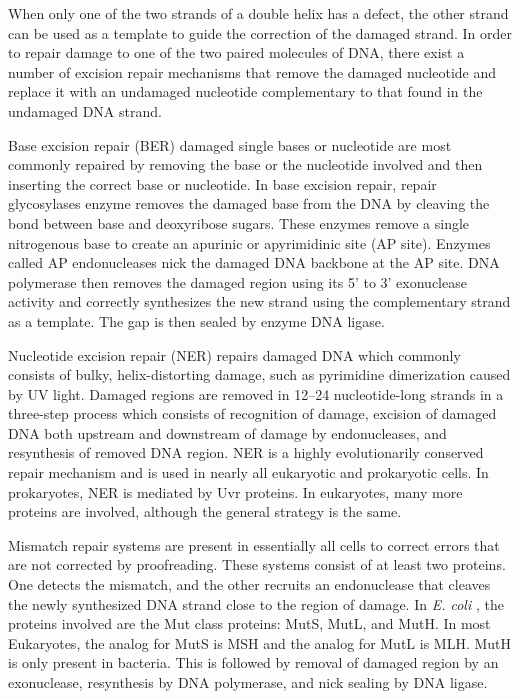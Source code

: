 When only one of the two strands of a double helix has a defect, the other strand can be used as a template to guide the correction of the damaged strand. In order to repair damage to one of the two paired molecules of DNA, there exist a number of excision repair mechanisms that remove the damaged nucleotide and replace it with an undamaged nucleotide complementary to that found in the undamaged DNA strand.

Base excision repair (BER) damaged single bases or nucleotide are most commonly repaired by removing the base or the nucleotide involved and then inserting the correct base or nucleotide. In base excision repair, repair glycosylases enzyme removes the damaged base from the DNA by cleaving the bond between base and deoxyribose sugars. These enzymes remove a single nitrogenous base to create an apurinic or apyrimidinic site (AP site). Enzymes called AP endonucleases nick the damaged DNA backbone at the AP site. DNA polymerase then removes the damaged region using its 5' to 3' exonuclease activity and correctly synthesizes the new strand using the complementary strand as a template. The gap is then sealed by enzyme DNA ligase.

Nucleotide excision repair (NER) repairs damaged DNA which commonly consists of bulky, helix-distorting damage, such as pyrimidine dimerization caused by UV light. Damaged regions are removed in 12--24 nucleotide-long strands in a three-step process which consists of recognition of damage, excision of damaged DNA both upstream and downstream of damage by endonucleases, and resynthesis of removed DNA region. NER is a highly evolutionarily conserved repair mechanism and is used in nearly all eukaryotic and prokaryotic cells. In prokaryotes, NER is mediated by Uvr proteins. In eukaryotes, many more proteins are involved, although the general strategy is the same.

Mismatch repair systems are present in essentially all cells to correct errors that are not corrected by proofreading. These systems consist of at least two proteins. One detects the mismatch, and the other recruits an endonuclease that cleaves the newly synthesized DNA strand close to the region of damage. In \emph{E. coli} , the proteins involved are the Mut class proteins: MutS, MutL, and MutH. In most Eukaryotes, the analog for MutS is MSH and the analog for MutL is MLH. MutH is only present in bacteria. This is followed by removal of damaged region by an exonuclease, resynthesis by DNA polymerase, and nick sealing by DNA ligase.

